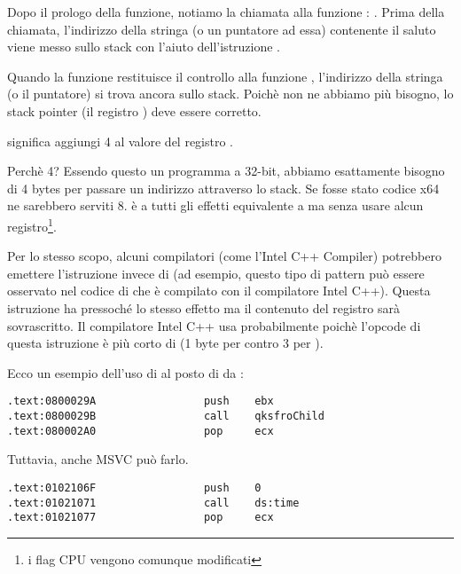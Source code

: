 Dopo il prologo della funzione, notiamo la chiamata alla funzione \printf{} : .
Prima della chiamata, l'indirizzo della stringa (o un puntatore ad essa) contenente il saluto viene messo sullo stack con l'aiuto dell'istruzione \PUSH.

Quando la funzione \printf restituisce il controllo alla funzione \main , l'indirizzo della stringa (o il puntatore) si trova ancora sullo stack.
Poichè non ne abbiamo più bisogno, lo \gls{stack pointer} (il registro \ESP ) deve essere corretto.

 significa aggiungi 4 al valore del registro \ESP.

Perchè 4? Essendo questo un programma a 32-bit, abbiamo esattamente bisogno di 4 bytes per passare un indirizzo attraverso lo stack. Se fosse stato codice x64 ne sarebbero serviti 8.
 è a tutti gli effetti equivalente a  ma senza usare alcun registro\footnote{i flag CPU vengono comunque modificati}.

\myindex{\oracle}

Per lo stesso scopo, alcuni compilatori (come l'Intel C++ Compiler) potrebbero emettere l'istruzione 
invece di \ADD (ad esempio, questo tipo di pattern può essere osservato nel codice di \oracle{} che è compilato con il compilatore Intel C++).
Questa istruzione ha pressoché lo stesso effetto ma il contenuto del registro \ECX sarà sovrascritto.
Il compilatore Intel C++ usa probabilmente  poichè l'opcode di questa istruzione è più corto di  (1 byte per  contro 3 per ).

Ecco un esempio dell'uso di \POP al posto di \ADD da \oracle{}:

\begin{lstlisting}[caption=\oracle 10.2 Linux (\ITph{}),style=customasmx86]
.text:0800029A                 push    ebx
.text:0800029B                 call    qksfroChild
.text:080002A0                 pop     ecx
\end{lstlisting}

Tuttavia, anche MSVC può farlo.

\begin{lstlisting}[caption=MineSweeper da Windows 7 32-bit]
.text:0102106F                 push    0
.text:01021071                 call    ds:time
.text:01021077                 pop     ecx
\end{lstlisting}

